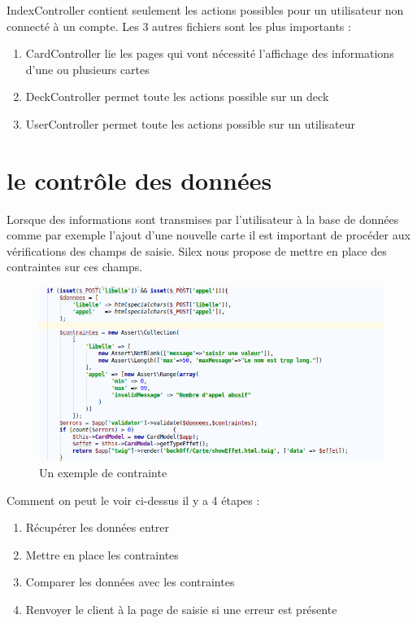 \documentclass[a4paper,11pt]{report}
\begin{document}
	IndexController contient seulement les actions possibles pour un utilisateur non connecté à un compte. Les 3 autres fichiers sont les plus importants :

	\begin{enumerate}
		\item CardController lie les pages qui vont nécessité l'affichage des informations d'une ou plusieurs cartes
		\item DeckController permet toute les actions possible sur un deck
		\item UserController permet toute les actions possible sur un utilisateur
	\end{enumerate}

	\section{le contrôle des données}
	Lorsque des informations sont transmises par l'utilisateur à la base de données comme par exemple l'ajout d'une nouvelle carte il est important de procéder aux vérifications des champs de saisie. Silex nous propose de mettre en place des contraintes sur ces champs.
    \begin{figure}[th]
      \begin{center}
        \includegraphics[scale=0.4]{Assets/exemple_contrainte.png}
        \caption{Un exemple de contrainte}
        \label{fig8}
      \end{center}
    \end{figure}

	Comment on peut le voir ci-dessus il y a 4 étapes :
	\begin{enumerate}
		\item Récupérer les données entrer
		\item Mettre en place les contraintes
		\item Comparer les données avec les contraintes
		\item Renvoyer le client à la page de saisie si une erreur est présente
	\end{enumerate}
\end{document}
